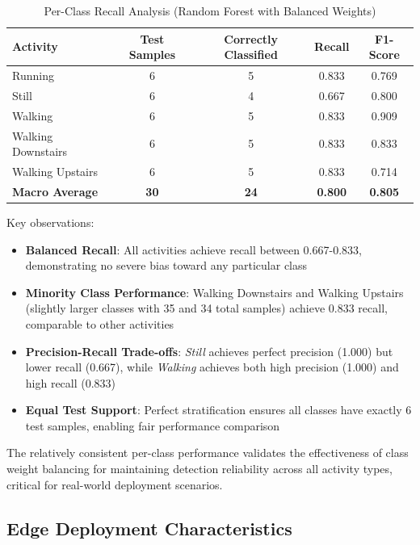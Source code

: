 \begin{table}[H]
    \centering
    \caption{Per-Class Recall Analysis (Random Forest with Balanced Weights)}
    \begin{tabular}{@{}lcccc@{}}
        \toprule
        Activity & Test Samples & Correctly Classified & Recall & F1-Score \\ 
        \midrule
        Running & 6 & 5 & 0.833 & 0.769 \\
        Still & 6 & 4 & 0.667 & 0.800 \\
        Walking & 6 & 5 & 0.833 & 0.909 \\
        Walking Downstairs & 6 & 5 & 0.833 & 0.833 \\
        Walking Upstairs & 6 & 5 & 0.833 & 0.714 \\
        \midrule
        \textbf{Macro Average} & \textbf{30} & \textbf{24} & \textbf{0.800} & \textbf{0.805} \\
        \bottomrule
    \end{tabular}
    \label{tab:class_balance_analysis}
\end{table}

Key observations:
\begin{itemize}
    \item \textbf{Balanced Recall}: All activities achieve recall between 0.667-0.833, demonstrating no severe bias toward any particular class
    \item \textbf{Minority Class Performance}: Walking Downstairs and Walking Upstairs (slightly larger classes with 35 and 34 total samples) achieve 0.833 recall, comparable to other activities
    \item \textbf{Precision-Recall Trade-offs}: \textit{Still} achieves perfect precision (1.000) but lower recall (0.667), while \textit{Walking} achieves both high precision (1.000) and high recall (0.833)
    \item \textbf{Equal Test Support}: Perfect stratification ensures all classes have exactly 6 test samples, enabling fair performance comparison
\end{itemize}

The relatively consistent per-class performance validates the effectiveness of class weight balancing for maintaining detection reliability across all activity types, critical for real-world deployment scenarios.

\subsection{Edge Deployment Characteristics}

